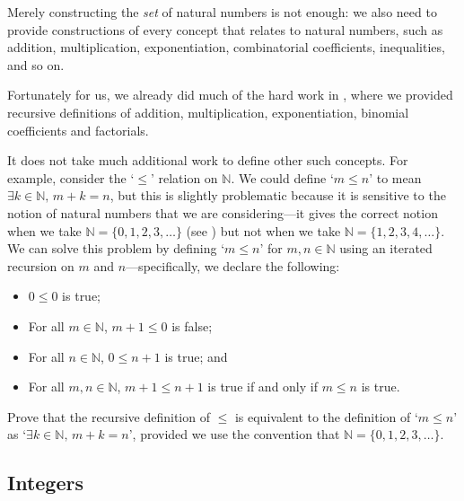 Merely constructing the \textit{set} of natural numbers is not enough: we also need to provide constructions of every concept that relates to natural numbers, such as addition, multiplication, exponentiation, combinatorial coefficients, inequalities, and so on.

Fortunately for us, we already did much of the hard work in , where we provided recursive definitions of addition, multiplication, exponentiation, binomial coefficients and factorials.

It does not take much additional work to define other such concepts. For example, consider the `$\le$' relation on $\mathbb{N}$. We could define `$m \le n$' to mean $\exists k \in \mathbb{N},\, m+k=n$, but this is slightly problematic because it is sensitive to the notion of natural numbers that we are considering---it gives the correct notion when we take $\mathbb{N} = \{ 0, 1, 2, 3, \dots \}$ (see ) but not when we take $\mathbb{N} = \{ 1, 2, 3, 4, \dots \}$. We can solve this problem by defining `$m \le n$' for $m,n \in \mathbb{N}$ using an iterated recursion on $m$ and $n$---specifically, we declare the following:
\begin{itemize}
\item $0 \le 0$ is true;
\item For all $m \in \mathbb{N}$, $m+1 \le 0$ is false;
\item For all $n \in \mathbb{N}$, $0 \le n+1$ is true; and
\item For all $m,n \in \mathbb{N}$, $m+1 \le n+1$ is true if and only if $m \le n$ is true.
\end{itemize}

\begin{exercise}
Prove that the recursive definition of $\le$ is equivalent to the definition of `$m \le n$' as `$\exists k \in \mathbb{N},\, m+k=n$', provided we use the convention that $\mathbb{N} = \{ 0, 1, 2, 3, \dots \}$.
\end{exercise}

\subsection*{Integers}

